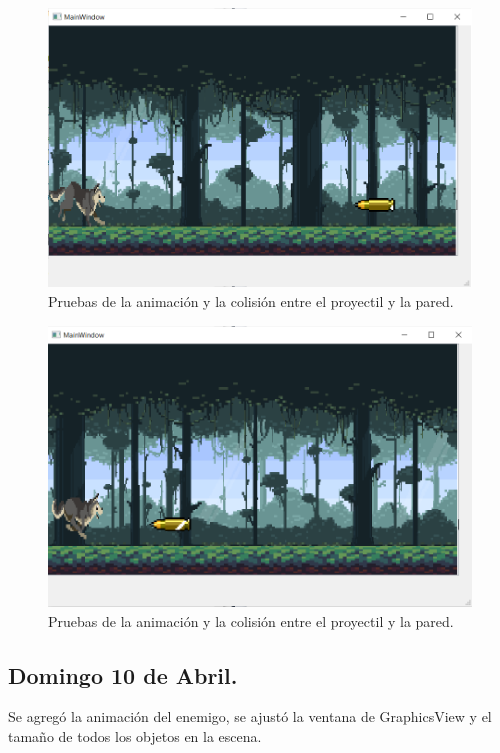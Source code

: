\documentclass{article}
\begin{document}
\begin{figure}[h]
\includegraphics[scale=0.55]{Images/proyectil1.png}
\centering
\caption{Pruebas de la animación y la colisión entre el proyectil y la pared.}
\label{fig:proyectil1}
\end{figure}

\begin{figure}[h]
\includegraphics[scale=0.55]{Images/proyectil2.png}
\centering
\caption{Pruebas de la animación y la colisión entre el proyectil y la pared.}
\label{fig:proyectil2}
\end{figure}

\subsection{Domingo 10 de Abril.}
Se agregó la animación del enemigo, se ajustó la ventana de GraphicsView y el tamaño de todos los objetos en la escena.
\end{document}
